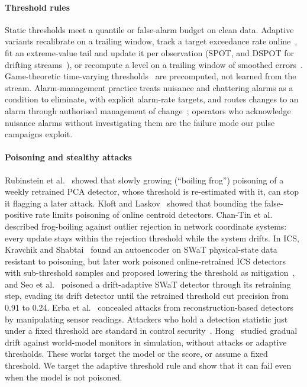 \documentclass[sigconf,review,anonymous]{acmart}
\begin{document}
\paragraph{Threshold rules}
Static thresholds meet a quantile or false-alarm budget on clean data. Adaptive variants recalibrate on
a trailing window, track a target exceedance rate online~\cite{gibbs2021aci}, fit an extreme-value tail
and update it per observation (SPOT, and DSPOT for drifting streams~\cite{siffer2017spot}), or
recompute a level on a trailing window of smoothed errors~\cite{hundman2018telemanom}. Game-theoretic
time-varying thresholds~\cite{ghafouri2016thresholds} are precomputed, not learned from the stream.
Alarm-management practice treats nuisance and chattering alarms as a condition to eliminate, with
explicit alarm-rate targets, and routes changes to an alarm through authorised management of
change~\cite{isa182, eemua191}; operators who acknowledge nuisance alarms without investigating them are
the failure mode our pulse campaigns exploit.

\paragraph{Poisoning and stealthy attacks}
Rubinstein et al.~\cite{rubinstein2009antidote} showed that slowly growing (``boiling frog'') poisoning
of a weekly retrained PCA detector, whose threshold is re-estimated with it, can stop it flagging a
later attack. Kloft and Laskov~\cite{kloft2010online, kloft2012security} showed that bounding the
false-positive rate limits poisoning of online centroid detectors. Chan-Tin et
al.~\cite{chantin2009frog, chantin2011frog} described frog-boiling against outlier rejection in network
coordinate systems: every update stays within the rejection threshold while the system drifts. In ICS,
Kravchik and Shabtai~\cite{kravchik2020frog} found an autoencoder on SWaT physical-state data resistant
to poisoning, but later work poisoned online-retrained ICS detectors with sub-threshold samples and
proposed lowering the threshold as mitigation~\cite{kravchik2021poisoning}, and Seo
et al.~\cite{seo2026retraining} poisoned a drift-adaptive SWaT detector through its retraining step,
evading its drift detector until the retrained threshold cut precision from 0.91 to 0.24. Erba
et al.~\cite{erba2020concealment} concealed attacks from reconstruction-based detectors by manipulating
sensor readings. Attackers who hold a detection statistic just under a fixed threshold are standard in
control security~\cite{cardenas2011process, urbina2016stealthy}. Hong~\cite{hong2026boiling} studied
gradual drift against world-model monitors in simulation, without attacks or adaptive thresholds. These
works target the model or the score, or assume a fixed threshold. We target the adaptive threshold rule
and show that it can fail even when the model is not poisoned.
\end{document}

